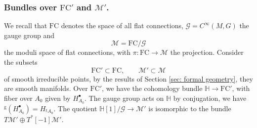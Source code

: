 \documentclass[11pt,a4paper]{amsart}
\theoremstyle{plain} %
\theoremstyle{definition}
\theoremstyle{remark}
\newcommand{\M}{\mathcal{M}}
\newcommand{\FC}{\mathrm{FC}}
\newcommand{\sfg}{\mathrm{g}} %
\begin{document}
{ \subsubsection{Bundles over $\FC'$ and $\M'$.}
We recall that $\FC$ denotes the space of all flat connections, $\mathcal{G} = C^\infty(M,G)$ the gauge group and 
\begin{equation}
    \M = \FC/\mathcal{G}
\end{equation}
the moduli space of flat connections, with $\pi \colon \FC \to \mathcal{M}$ the projection. Consider the subsets
\begin{equation}
   \FC'\subset \FC, \qquad \M' \subset \mathcal{M}
\end{equation}
of smooth irreducible points, by the results of Section \ref{sec: formal geometry}, they are smooth manifolds. 
Over $\FC'$, we have the cohomology bundle $\mathbb{H} \to \FC'$, with fiber over $A_0$ given by $H^\bullet_{A_0}$. The gauge group acts on $\mathbb{H}$ by conjugation, we have ${}^\sfg (H^\bullet_{A_0}) = H_{{}^\sfg A_0}$. The quotient
    $\mathbb{H}[1]/\mathcal{G} \to \M'$ is isomorphic to the bundle $T\M' \oplus T^*[-1]\M'$. 
}
\end{document}

